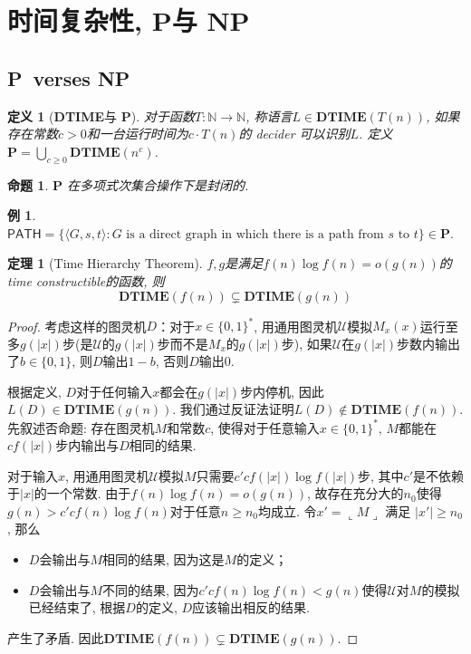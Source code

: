 \documentclass[8pt]{article}
\theoremstyle{compact}
\newtheorem{theorem}{定理}[section]
\newtheorem{definition}{定义}[section]
\newtheorem{proposition}{命题}[section]
\newtheorem{example}{例}[section]
\def\ge{\geqslant}
\def\rep#1{\llcorner{#1}\lrcorner}
\def\DTIME{\textbf{DTIME}}
\def\P{\textbf{P}}
\def\NP{\textbf{NP}}
\begin{document}
\newpage
\section{时间复杂性, \P 与 \NP}
\subsection{\P \ verses \NP}
\begin{definition}[\DTIME 与 \P]
	对于函数$T: \mathbb N \to \mathbb N$, 称语言$L \in \DTIME(T(n))$, 如果存在常数$c > 0$和一台运行时间为$c \cdot T(n)$的 decider 可以识别$L$. 定义 $\P = \bigcup_{c \ge 0}\DTIME(n^c)$. 
\end{definition}
\begin{proposition}
	$\P$ 在多项式次集合操作下是封闭的.
\end{proposition}
\begin{example}
	$\textsf{PATH} = \{ \langle G, s, t\rangle : G \textrm{ is a direct graph in which there is a path from }s \textrm{ to } t\} \in \P.$
\end{example}
\begin{theorem}[Time Hierarchy Theorem]
	$f, g$是满足$f(n) \log f(n) = o(g(n))$的time constructible的函数, 则
	$$\DTIME(f(n)) \subsetneq \DTIME(g(n))$$
	\label{time_hierarchy_thm}
\end{theorem}
\begin{proof}
	考虑这样的图灵机$D$：对于$x \in \{0, 1\}^*$, 用通用图灵机$\mathcal{U}$模拟$M_x(x)$运行至多$g(|x|)$步(是$\mathcal U$的$g(|x|)$步而不是$M_x$的$g(|x|)$步), 如果$\mathcal{U}$在$g(|x|)$步数内输出了$b \in \{0, 1\}$, 则$D$输出$1-b$, 否则$D$输出$0$. 

	根据定义, $D$对于任何输入$x$都会在$g(|x|)$步内停机, 因此$L(D) \in \DTIME(g(n))$. 我们通过反证法证明$L(D) \notin \DTIME(f(n))$. 先叙述否命题: 存在图灵机$M$和常数$c$, 使得对于任意输入$x \in \{0, 1\}^*$, $M$都能在$cf(|x|)$步内输出与$D$相同的结果. 

	对于输入$x$, 用通用图灵机$\mathcal{U}$模拟$M$只需要$c'cf(|x|)\log f(|x|)$步, 其中$c'$是不依赖于$|x|$的一个常数. 由于$f(n) \log f(n) = o(g(n))$, 故存在充分大的$n_0$使得$g(n) > c'cf(n) \log f(n)$对于任意$n \ge n_0$均成立. 令$x' = \rep{M}$ 满足 $|x'| \ge n_0$, 那么
	\begin{itemize}
		\item $D$会输出与$M$相同的结果, 因为这是$M$的定义；
		\item $D$会输出与$M$不同的结果, 因为$c'cf(n)\log f(n) < g(n)$使得$\mathcal U$对$M$的模拟已经结束了, 根据$D$的定义, $D$应该输出相反的结果. 
	\end{itemize}

	产生了矛盾. 因此$\DTIME(f(n)) \subsetneq \DTIME(g(n))$. 
\end{proof}
\end{document}
